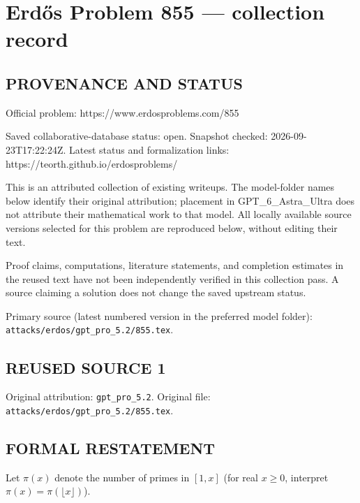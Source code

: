 \section*{Erd\H{o}s Problem 855 --- collection record}

\subsection*{PROVENANCE AND STATUS}
Official problem: https://www.erdosproblems.com/855

Saved collaborative-database status: open.
Snapshot checked: 2026-09-23T17:22:24Z.
Latest status and formalization links: https://teorth.github.io/erdosproblems/

This is an attributed collection of existing writeups. The model-folder names below identify their original attribution; placement in GPT\_6\_Astra\_Ultra does not attribute their mathematical work to that model. All locally available source versions selected for this problem are reproduced below, without editing their text.

Proof claims, computations, literature statements, and completion estimates in the reused text have not been independently verified in this collection pass. A source claiming a solution does not change the saved upstream status.

Primary source (latest numbered version in the preferred model folder): \texttt{attacks/erdos/gpt\_pro\_5.2/855.tex}.

\subsection*{REUSED SOURCE 1}
Original attribution: \texttt{gpt\_pro\_5.2}.
Original file: \texttt{attacks/erdos/gpt\_pro\_5.2/855.tex}.


\subsection*{FORMAL RESTATEMENT}
Let $\pi(x)$ denote the number of primes in $[1,x]$ (for real $x\ge 0$, interpret $\pi(x)=\pi(\lfloor x\rfloor)$).

